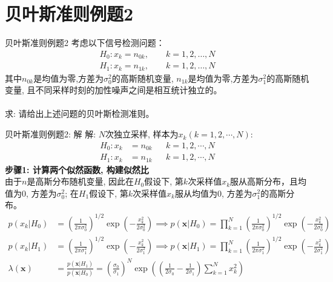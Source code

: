 \section{贝叶斯准则例题2}

\begin{frame}{贝叶斯准则例题2}
考虑以下信号检测问题：
\begin{align*}
H_0: x_k=n_{0k}, \qquad k=1,2,\dots,N\\
H_1: x_k=n_{1k}, \qquad k=1,2,\dots,N
\end{align*}
其中$n_{0k}$是均值为零,方差为$\sigma_0^2$的高斯随机变量, $n_{1k}$是均值为零,方差为$\sigma_1^2$的高斯随机变量,  且不同采样时刻的加性噪声之间是相互统计独立的。\\
~\\
求: 请给出上述问题的贝叶斯检测准则。
\end{frame}

\begin{frame}[shrink]{贝叶斯准则例题2: 解}
解: $N$次独立采样, 样本为$x_k(k=1,2,\cdots,N)$:
\begin{align*}
H_0: x_k&=n_{0k} && k=1,2,\cdots,N\\
H_1: x_k&=n_{1k} && k=1,2,\cdots,N
\end{align*}
\textbf{步骤1: 计算两个似然函数, 构建似然比}\\
由于$n$是高斯分布随机变量, 因此在$H_0$假设下, 第$k$次采样值$x_k$服从高斯分布，且均值为0, 方差为$\sigma_0^2$; 在$H_1$假设下, 第$k$次采样值$x_k$服从均值为0, 方差为$\sigma_1^2$的高斯分布。
\begin{align*}
p(x_k|H_0)&=\left(\frac{1}{2\pi\sigma_0^2}\right)^{1/2}\exp\left(-\frac{x_k^2}{2\sigma_0^2}\right)\implies p(\bm{x}|H_0)=\prod_{k=1}^{N}\left(\frac{1}{2\pi\sigma_0^2}\right)^{1/2}\exp\left(-\frac{x_k^2}{2\sigma_0^2}\right)\\
p(x_k|H_1)&=\left(\frac{1}{2\pi\sigma_1^2}\right)^{1/2}\exp\left(-\frac{x_k^2}{2\sigma_1^2}\right)\implies p(\bm{x}|H_1)=\prod_{k=1}^{N}\left(\frac{1}{2\pi\sigma_1^2}\right)^{1/2}\exp\left(-\frac{x_k^2}{2\sigma_1^2}\right)\\
\lambda(\bm{x})&=\frac{p(\bm{x}|H_1)}{p(\bm{x}|H_0)}=\left(\frac{\sigma_0}{\sigma_1}\right)^N\exp\left(\left(\frac{1}{2\sigma_0}-\frac{1}{2\sigma_1}\right)\sum\limits_{k=1}^{N}x_k^2\right)
\end{align*} 
\end{frame}

